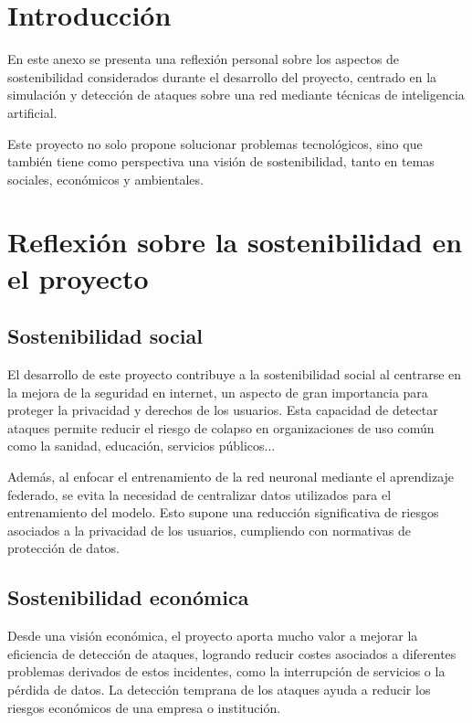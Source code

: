 
\section{Introducción}
\label{sec:IntroduccionSostenibilizacion}
En este anexo se presenta una reflexión personal sobre los aspectos de sostenibilidad considerados durante el desarrollo del proyecto, centrado en la simulación y detección de ataques sobre una red mediante técnicas de inteligencia artificial.

Este proyecto no solo propone solucionar problemas tecnológicos, sino que también tiene como perspectiva una visión de sostenibilidad, tanto en temas sociales, económicos y ambientales.

\section{Reflexión sobre la sostenibilidad en el proyecto}
\label{sec:Reflexion}
\subsection{Sostenibilidad social}
\label{subsec:Social}
El desarrollo de este proyecto contribuye a la sostenibilidad social al centrarse en la mejora de la seguridad en internet, un aspecto de gran importancia para proteger la privacidad y derechos de los usuarios. Esta capacidad de detectar ataques permite reducir el riesgo de colapso en organizaciones de uso común como la sanidad, educación, servicios públicos...

Además, al enfocar el entrenamiento de la red neuronal mediante el aprendizaje federado, se evita la necesidad de centralizar datos utilizados para el entrenamiento del modelo. Esto supone una reducción significativa de riesgos asociados a la privacidad de los usuarios, cumpliendo con normativas de protección de datos.

\subsection{Sostenibilidad económica}
\label{subsec:Economica}
Desde una visión económica, el proyecto aporta mucho valor a mejorar la eficiencia de detección de ataques, logrando reducir costes asociados a diferentes problemas derivados de estos incidentes, como la interrupción de servicios o la pérdida de datos. La detección temprana de los ataques ayuda a reducir los riesgos económicos de una empresa o institución.

